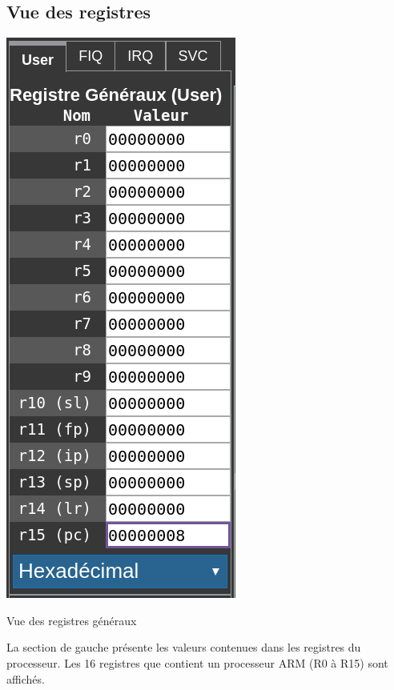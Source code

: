 \documentclass{tufte-handout}
\begin{document}
\subsection{Vue des registres}

\begin{marginfigure}
\includegraphics[width=0.8\linewidth]{pics/registres.png}
\label{f:registres}
\caption{Vue des registres généraux}
\end{marginfigure}
La section de gauche présente les valeurs contenues dans les registres du processeur.
Les 16 registres que contient un processeur ARM (R0 à R15) sont affichés. 
\end{document}
